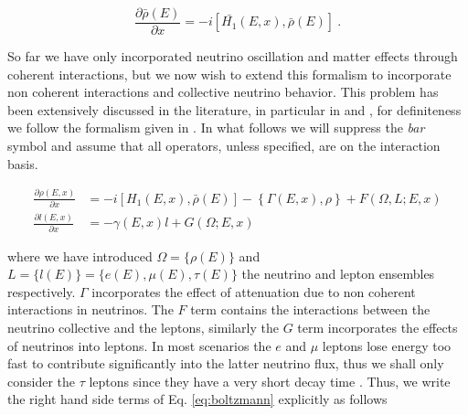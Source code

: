 \documentclass[3p,12pt,authoryear]{elsarticle}
\newcommand{\pa}[2]{\frac{\partial #1}{\partial #2}}
\begin{document}
\begin{equation}
\pa{\bar{\rho}(E)}{x} = -i [ \bar{H_1} (E,x), \bar{\rho}(E) ]~.
\label{eq:schrodinger}
\end{equation}

So far we have only incorporated neutrino oscillation and matter effects through coherent interactions, but we now wish to extend this formalism to incorporate non coherent interactions and collective neutrino behavior. This problem has been extensively discussed in the literature, in particular in \citep{Duan:2010tk,Strack:qd,Zhang:2013ay} and \citep{Cirelli:mw,Blennow:2007tw,Arguelles:2012cf}, for definiteness we follow the formalism given in \citep{Gonzalez-Garcia:2005xw}. In what follows we will suppress the {\it bar} symbol and assume that all operators, unless specified, are on the interaction basis. 

\begin{subequations}
\label{eq:boltzmann}
\begin{align}
\pa{\rho(E,x)}{x} &= -i [ H_1 (E,x), \bar{\rho}(E) ] - \left\{ \Gamma(E,x), \rho \right\} + F(\Omega,L;E,x) \\
\pa{l(E,x)}{x} &= - \gamma(E,x)l + G(\Omega;E,x)
\end{align}
\end{subequations}

where we have introduced $\Omega = \{\rho(E)\} $ and $ L = \{ l(E) \} = \{ e(E), \mu(E), \tau(E) \}$ the neutrino and lepton ensembles respectively. $\Gamma$ incorporates the effect of attenuation due to non coherent interactions in neutrinos. The $F$ term contains the interactions between the neutrino collective and the leptons, similarly the $G$ term incorporates the effects of neutrinos into leptons. In most scenarios the $e$ and $\mu$ leptons lose energy too fast to contribute significantly into the latter neutrino flux, thus we shall only consider the $\tau$ leptons since they have a very short decay time \citep{Halzen:kq}. Thus, we write the right hand side terms of Eq. \eqref{eq:boltzmann}  explicitly as follows
\end{document}
